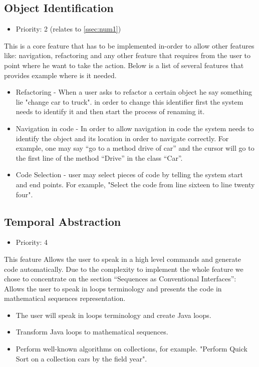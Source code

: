 \subsection{Object Identification}
\begin{itemize}
	\item Priority: 2 (relates to \ref{ssec:num1})
\end{itemize}
This is a core feature that has to be implemented in-order to allow other features like: navigation, refactoring and any other feature that requires from the user to point where he want to take the action. Below is a list of several features that provides example where is it needed.
\begin{itemize}
	\item Refactoring - When a user asks to refactor a certain object he say something lie "change car to truck". in order to change this identifier first the system needs to identify it and then start the process of renaming it.
	\item Navigation in code - In order to allow navigation in code the system needs to identify the object and its location in order to navigate correctly. For example, one may say “go to a method drive of car” and the cursor will go to the first line of the method “Drive” in the class “Car”.
	\item Code Selection - user may select pieces of code by telling the system start and end points. For example, "Select the code from line sixteen to line twenty four".
\end{itemize}
\subsection{Temporal Abstraction}
\begin{itemize}
	\item Priority: 4
\end{itemize}
This feature Allows the user to speak in a high level commands and generate code automatically. Due to the complexity to implement the whole feature we chose to concentrate on the section “Sequences as Conventional Interfaces”: Allows the user to speak in loops terminology and presents the code in mathematical sequences representation.
\begin{itemize}
	\item The user will speak in loops terminology and create Java loops.
	\item Transform Java loops to mathematical sequences.
	\item Perform well-known algorithms on collections, for example. "Perform Quick Sort on a collection cars by the field year".
\end{itemize}
